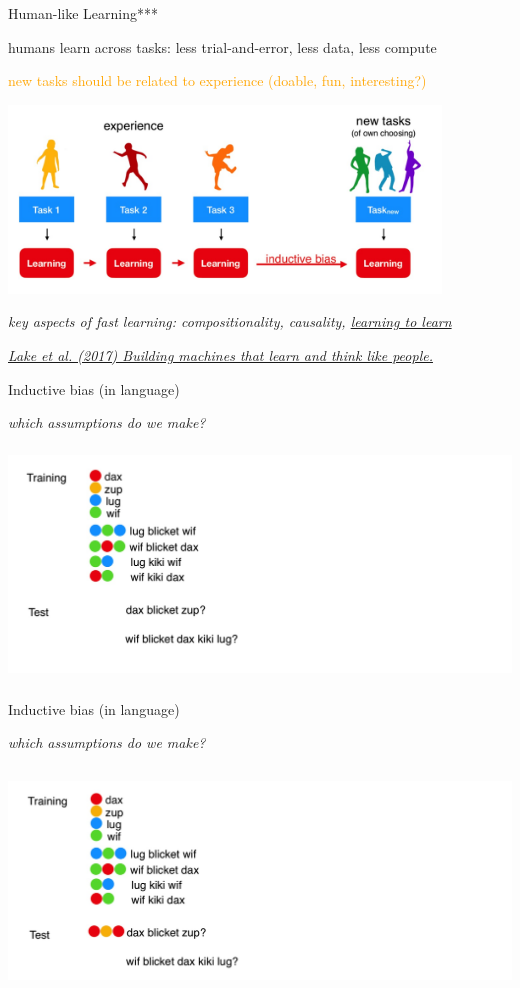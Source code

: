 \begin{frame}{Human-like Learning***}
\centerline{humans learn across tasks: less trial-and-error, less data, less compute}
\centerline{\textcolor{orange}{new tasks should be related to experience (doable, fun, interesting?)}}
 
\centering\includegraphics[height=5cm]{image/img184546.jpg}

\centerline{\textit{key aspects of fast learning: compositionality, causality, \underline{learning to learn}}}
\vspace{0.3cm}
\raggedright{\footnotesize{\textit{
\href{https://cims.nyu.edu/~brenden/papers/LakeEtAl2017BBS.pdf}{Lake et al. (2017) Building machines that learn and think like people.}}
}}

\end{frame}

\begin{frame}{Inductive bias (in language)}
\centerline{\textit{which assumptions do we make?}}
\centering\includegraphics[height=6.2cm]{image/img185829.jpg}

\end{frame}

\begin{frame}{Inductive bias (in language)}
\centerline{\textit{which assumptions do we make?}}
\centering\includegraphics[height=6cm]{image/img185953.jpg}

\end{frame}

